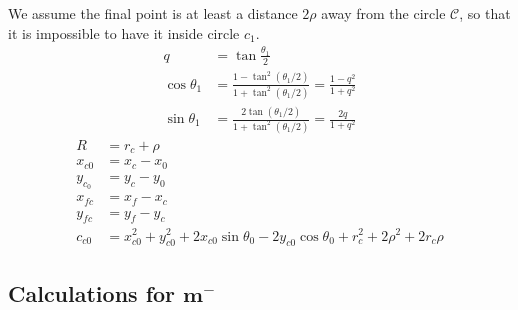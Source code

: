 \documentclass[12pt]{article}
\begin{document}
We assume the final point is at least a distance $2\rho$ away from the circle $\mathcal{C}$, so that it is impossible to have it inside circle $c_1$.
\begin{align*}
    q &= \tan\frac{\theta_1}{2}\\
    \cos\theta_1 &= \frac{1-\tan^2(\theta_1/2)}{1+\tan^2(\theta_1/2)}
    = \frac{1-q^2}{1+q^2}\\
    \sin\theta_1 &= \frac{2\tan(\theta_1/2)}{1+\tan^2(\theta_1/2)}
    = \frac{2q}{1+q^2}
\end{align*}
\begin{align}
    R &= r_c+\rho\\
    x_{c0} &= x_c - x_0\\
    y_{c_0} &= y_c - y_0\\
    x_{fc} &= x_f - x_c\\
    y_{fc} &= y_f - y_c\\
    c_{c0} &= x_{c0}^2 + y_{c0}^2 + 2x_{c0}\sin\theta_0 - 2y_{c0}\cos\theta_0 + r_c^2 + 2\rho^2 + 2r_c\rho
\end{align}

\subsection{Calculations for $\mathbf{m^-}$}
\end{document}
